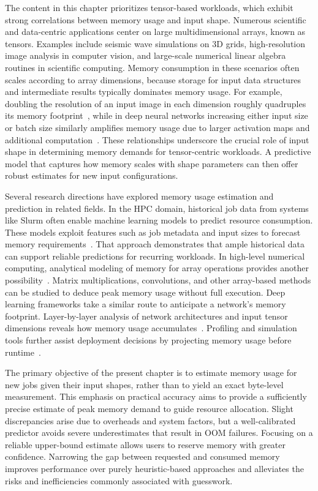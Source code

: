 The content in this chapter prioritizes tensor-based workloads, which exhibit strong correlations between memory usage and input shape.
Numerous scientific and data-centric applications center on large multidimensional arrays, known as tensors.
Examples include seismic wave simulations on \ac{3D} grids, high-resolution image analysis in computer vision, and large-scale numerical linear algebra routines in scientific computing.
Memory consumption in these scenarios often scales according to array dimensions, because storage for input data structures and intermediate results typically dominates memory usage.
For example, doubling the resolution of an input image in each dimension roughly quadruples its memory footprint~\cite{stackoverflow_memory_inv}, while in deep neural networks increasing either input size or batch size similarly amplifies memory usage due to larger activation maps and additional computation~\cite{dell_3dunet_memory}.
These relationships underscore the crucial role of input shape in determining memory demands for tensor-centric workloads.
A predictive model that captures how memory scales with shape parameters can then offer robust estimates for new input configurations.

Several research directions have explored memory usage estimation and prediction in related fields.
In the \ac{HPC} domain, historical job data from systems like Slurm often enable machine learning models to predict resource consumption.
These models exploit features such as job metadata and input sizes to forecast memory requirements~\cite{yoo2003slurm}.
That approach demonstrates that ample historical data can support reliable predictions for recurring workloads.
In high-level numerical computing, analytical modeling of memory for array operations provides another possibility~\cite{cornell_memory_workshop}.
Matrix multiplications, convolutions, and other array-based methods can be studied to deduce peak memory usage without full execution.
Deep learning frameworks take a similar route to anticipate a network's memory footprint.
Layer-by-layer analysis of network architectures and input tensor dimensions reveals how memory usage accumulates~\cite{gao2020, dell_3dunet_memory}.
Profiling and simulation tools further assist deployment decisions by projecting memory usage before runtime~\cite{tanash2019}.

The primary objective of the present chapter is to estimate memory usage for new jobs given their input shapes, rather than to yield an exact byte-level measurement.
This emphasis on practical accuracy aims to provide a sufficiently precise estimate of peak memory demand to guide resource allocation.
Slight discrepancies arise due to overheads and system factors, but a well-calibrated predictor avoids severe underestimates that result in \ac{OOM} failures.
Focusing on a reliable upper-bound estimate allows users to reserve memory with greater confidence.
Narrowing the gap between requested and consumed memory improves performance over purely heuristic-based approaches and alleviates the risks and inefficiencies commonly associated with guesswork.